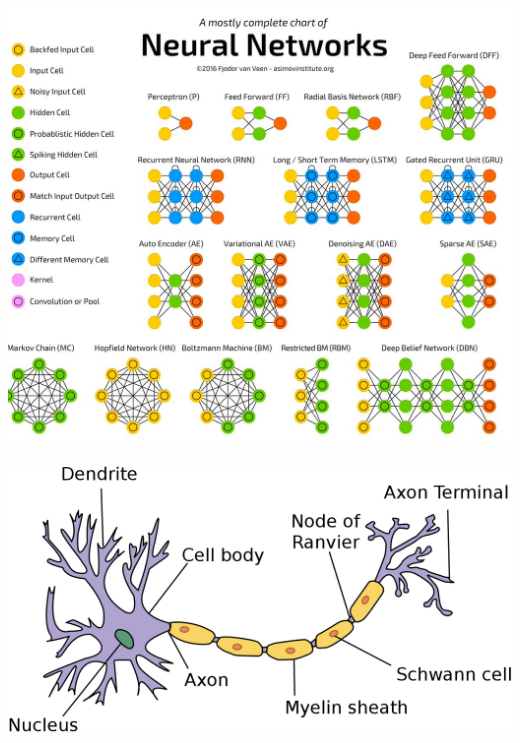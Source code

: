 \documentclass[aspectratio=169, usenames, dvipsnames]{beamer}
\begin{document}
{
  
  \begin{frame}
    \centering
    \includegraphics[height=\textheight]{neuralnet_zoo}
  \end{frame}

  \begin{frame}
    \centering
    \vfill
    \includegraphics[height=.65\textheight]{neuron}
    \vfill
  \end{frame}

}
\end{document}
